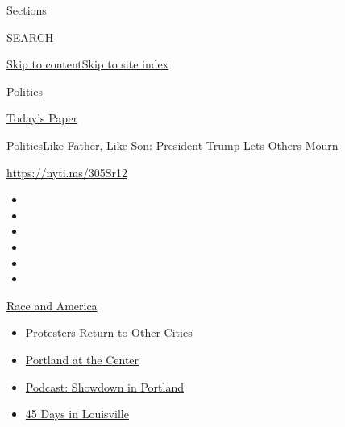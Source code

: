 Sections

SEARCH

\protect\hyperlink{site-content}{Skip to
content}\protect\hyperlink{site-index}{Skip to site index}

\href{https://www.nytimes3xbfgragh.onion/section/politics}{Politics}

\href{https://myaccount.nytimes3xbfgragh.onion/auth/login?response_type=cookie\&client_id=vi}{}

\href{https://www.nytimes3xbfgragh.onion/section/todayspaper}{Today's
Paper}

\href{/section/politics}{Politics}\textbar{}Like Father, Like Son:
President Trump Lets Others Mourn

\url{https://nyti.ms/305Sr12}

\begin{itemize}
\item
\item
\item
\item
\item
\item
\end{itemize}

\href{https://www.nytimes3xbfgragh.onion/news-event/george-floyd-protests-minneapolis-new-york-los-angeles?action=click\&pgtype=Article\&state=default\&region=TOP_BANNER\&context=storylines_menu}{Race
and America}

\begin{itemize}
\tightlist
\item
  \href{https://www.nytimes3xbfgragh.onion/2020/07/26/us/protests-portland-seattle-trump.html?action=click\&pgtype=Article\&state=default\&region=TOP_BANNER\&context=storylines_menu}{Protesters
  Return to Other Cities}
\item
  \href{https://www.nytimes3xbfgragh.onion/2020/07/24/us/portland-oregon-protests-white-race.html?action=click\&pgtype=Article\&state=default\&region=TOP_BANNER\&context=storylines_menu}{Portland
  at the Center}
\item
  \href{https://www.nytimes3xbfgragh.onion/2020/07/23/podcasts/the-daily/portland-protests.html?action=click\&pgtype=Article\&state=default\&region=TOP_BANNER\&context=storylines_menu}{Podcast:
  Showdown in Portland}
\item
  \href{https://www.nytimes3xbfgragh.onion/interactive/2020/07/16/us/black-lives-matter-protests-louisville-breonna-taylor.html?action=click\&pgtype=Article\&state=default\&region=TOP_BANNER\&context=storylines_menu}{45
  Days in Louisville}
\end{itemize}

